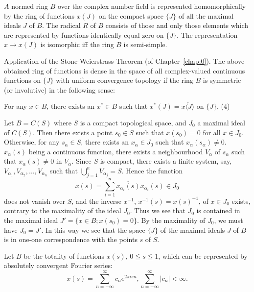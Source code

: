 \begin{theorem}\label{thm:XI.2.Theorem.4} $A$ normed ring $B$ over the complex number field is represented homomorphically by the ring of functions $x(J)$ on the compact space $\{J\}$ of all the maximal ideals $J$ of $B$. The radical $R$ of $B$ consists of those and only those elements which are represented by functions identically equal zero on $\{J\}$. The representation $x \to x(J)$ is isomorphic iff the ring $B$ is semi-simple. 
\end{theorem}

Application of the Stone-Weierstrass Theorem (of Chapter~\ref{chap:0}). The above obtained ring of functions is dense in the space of all complex-valued continuous functions on $\{J\}$ with uniform convergence topology if the ring $B$ is symmetric (or involutive) in the following sense: 

For any $x \in B$, there exists an $x^{*} \in B$ such that $x^{*}(J) = \overline{x\langle J\rangle}$ on $\{J\}$. ($4$) 


\begin{example}\label{ex:XI.2.Example.1} Let $B = C(S)$ where $S$ is a compact topological space, and $J_0$ a maximal ideal of $C(S)$. Then there exists a point $s_0 \in S$ such that $x(s_0) = 0$ for all $x \in J_0$. Otherwise, for any $s_\alpha \in S$, there exists an $x_\alpha \in J_0$ such that $x_\alpha(s_\alpha) \neq 0$. $x_\alpha(s)$ being a continuous function, there exists a neighbourhood $V_\alpha$ of $s_\alpha$ such that $x_\alpha(s) \neq 0$ in $V_\alpha$. Since $S$ is compact, there exists a finite system, say, $V_{\alpha_1}, V_{\alpha_2}, \ldots, V_{\alpha_n}$ such that $\bigcup\limits_{j=1}^{n} V_{\alpha_j} = S$. Hence the function 
\[
x (s) = \sum\limits_{i=1} ^{n} \overline {{{{x _ {\alpha_{i}} (s)}}}} x _ {\alpha_{i}} (s) \in J _{0}
\]
does not vanish over $S$, and the inverse $x^{-1}$, $x^{-1}(s) = x(s)^{-1}$, of $x \in J_0$ exists, contrary to the maximality of the ideal $J_0$. Thus we see that $J_0$ is contained in the maximal ideal $J' = \{x \in B; x(s_0) = 0\}$. By the maximality of $J_0$, we must have $J_0 = J'$. In this way we see that the space $\{J\}$ of the maximal ideals $J$ of $B$ is in one-one correspondence with the points $s$ of $S$. 
\end{example}

\begin{example}\label{ex:XI.2.Example.2} Let $B$ be the totality of functions $x(s)$, $0 \leqq s \leqq 1$, which can be represented by absolutely convergent Fourier series: 
\[
x (s) = \sum\limits_{n = - \infty} ^{\infty} c _{n} e ^{2 \pi i s n}, \sum\limits_{n = - \infty} ^{\infty} | c _{n} | < \infty .
\]
\end{example}

